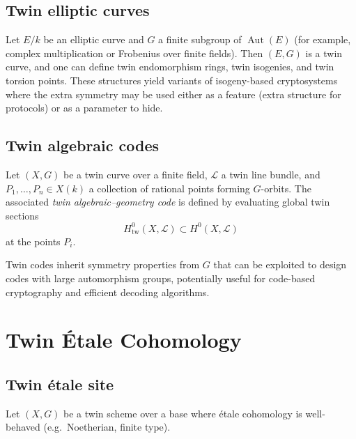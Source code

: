 \documentclass[11pt,a4paper]{article}
\numberwithin{equation}{section}
\DeclareMathOperator{\Aut}{Aut}
\newcommand{\TwinScheme}{(X,G)}
\newcommand{\Lcal}{\mathcal{L}}
\begin{document}
	\subsection{Twin elliptic curves}
	
	\begin{example}
		Let $E/k$ be an elliptic curve and $G$ a finite subgroup of $\Aut(E)$ (for example, complex multiplication
		or Frobenius over finite fields).
		Then $(E,G)$ is a twin curve, and one can define twin endomorphism rings, twin isogenies, and twin torsion points.
		These structures yield variants of isogeny-based cryptosystems where the extra symmetry may be 
		used either as a feature (extra structure for protocols) or as a parameter to hide.
	\end{example}
	
	\subsection{Twin algebraic codes}
	
	\begin{definition}
		Let $\TwinScheme$ be a twin curve over a finite field, $\Lcal$ a twin line bundle, and $P_1,\dots,P_n\in X(k)$
		a collection of rational points forming $G$-orbits. The associated \emph{twin algebraic--geometry code} is defined 
		by evaluating global twin sections
		\[
		H^0_{\mathrm{tw}}(X,\Lcal)\subset H^0(X,\Lcal)
		\]
		at the points $P_i$.
	\end{definition}
	
	\begin{remark}
		Twin codes inherit symmetry properties from $G$ that can be exploited to design codes with large automorphism groups,
		potentially useful for code-based cryptography and efficient decoding algorithms.
	\end{remark}
	
	\section{Twin \'Etale Cohomology}
	\label{sec:etale}
	
	\subsection{Twin \'etale site}
	
	Let $\TwinScheme$ be a twin scheme over a base where \'etale cohomology is well-behaved (e.g.\ Noetherian, finite type).
	
\end{document}
